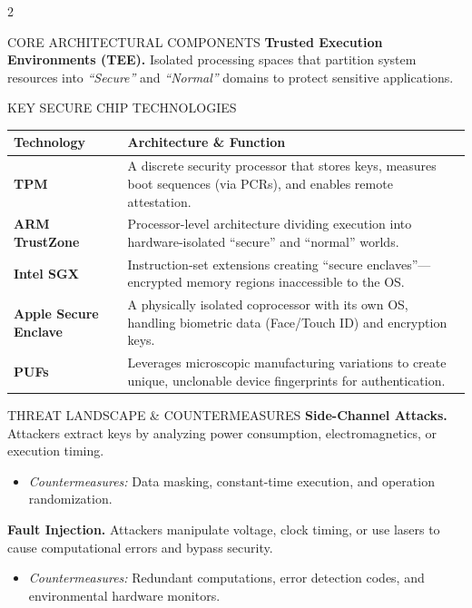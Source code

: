 \documentclass[10pt]{article}
\begin{document}
\begin{multicols}{2}
\begin{sectionbox}{CORE ARCHITECTURAL COMPONENTS}
\textbf{Trusted Execution Environments (TEE).}
Isolated processing spaces that partition system resources into \textit{``Secure''} and \textit{``Normal''} domains to protect sensitive applications.
\end{sectionbox}

\begin{sectionbox}{KEY SECURE CHIP TECHNOLOGIES}
\small
\vspace{1mm}
\centering
\footnotesize
\begin{tabular}{>{\bfseries}p{2.1cm} p{4.8cm}}
\toprule
\textbf{Technology} & \textbf{Architecture \& Function} \\
\midrule
TPM & A discrete security processor that stores keys, measures boot sequences (via PCRs), and enables remote attestation. \\[2pt]
ARM TrustZone & Processor-level architecture dividing execution into hardware-isolated ``secure'' and ``normal'' worlds. \\[2pt]
Intel SGX & Instruction-set extensions creating ``secure enclaves''---encrypted memory regions inaccessible to the OS. \\[2pt]
Apple Secure Enclave & A physically isolated coprocessor with its own OS, handling biometric data (Face/Touch ID) and encryption keys. \\[2pt]
PUFs & Leverages microscopic manufacturing variations to create unique, unclonable device fingerprints for authentication. \\
\bottomrule
\end{tabular}
\vspace{0.5mm}
\raggedright
\end{sectionbox}

\begin{sectionbox}{THREAT LANDSCAPE \& COUNTERMEASURES}
\small
\textbf{Side-Channel Attacks.}
Attackers extract keys by analyzing power consumption, electromagnetics, or execution timing.
\begin{itemize}
\item \textit{Countermeasures:} Data masking, constant-time execution, and operation randomization.
\end{itemize}

\textbf{Fault Injection.}
Attackers manipulate voltage, clock timing, or use lasers to cause computational errors and bypass security.
\begin{itemize}
\item \textit{Countermeasures:} Redundant computations, error detection codes, and environmental hardware monitors.
\end{itemize}


\end{sectionbox}
\end{multicols}
\end{document}
